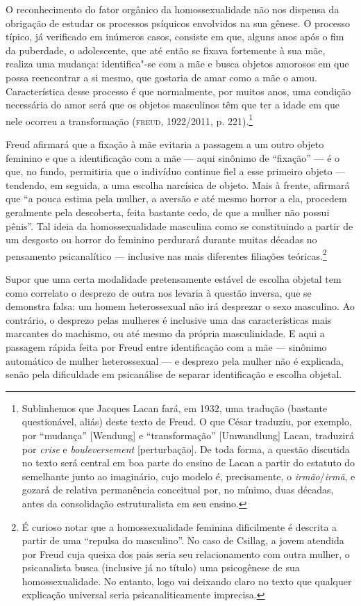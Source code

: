 O reconhecimento do fator orgânico da homossexualidade não nos dispensa
da obrigação de estudar os processos psíquicos envolvidos na sua gênese.
O processo típico, já verificado em inúmeros casos, consiste em que,
alguns anos após o fim da puberdade, o adolescente, que até então se
fixava fortemente à sua mãe, realiza uma mudança: identifica"-se com a
mãe e busca objetos amorosos em que possa reencontrar a si mesmo, que
gostaria de amar como a mãe o amou. Característica desse processo é que
normalmente, por muitos anos, uma condição necessária do amor será que
os objetos masculinos têm que ter a idade em que nele ocorreu a
transformação (\textsc{freud}, 1922/2011, p. 221).\footnote{Sublinhemos que
  Jacques Lacan fará, em 1932, uma tradução (bastante questionável,
  aliás) deste texto de Freud. O que César traduziu, por exemplo, por
  ``mudança'' {[}Wendung{]} e ``transformação'' {[}Umwandlung{]} Lacan,
  traduzirá por \emph{crise} e \emph{bouleversement} {[}perturbação{]}.
  De toda forma, a questão discutida no texto será central em boa parte
  do ensino de Lacan a partir do estatuto do semelhante junto ao
  imaginário, cujo modelo é, precisamente, o \emph{irmão}/\emph{irmã}, e
  gozará de relativa permanência conceitual por, no mínimo, duas
  décadas, antes da consolidação estruturalista em seu ensino.}

Freud afirmará que a fixação à mãe evitaria a passagem a um outro objeto
feminino e que a identificação com a mãe --- aqui sinônimo de
``fixação'' --- é o que, no fundo, permitiria que o indivíduo continue
fiel a esse primeiro objeto --- tendendo, em seguida, a uma escolha
narcísica de objeto. Mais à frente, afirmará que ``a pouca estima pela
mulher, a aversão e até mesmo horror a ela, procedem geralmente pela
descoberta, feita bastante cedo, de que a mulher não possui pênis''. Tal
ideia da homossexualidade masculina como se constituindo a partir de um
desgosto ou horror do feminino perdurará durante muitas décadas no
pensamento psicanalítico --- inclusive nas mais diferentes filiações
teóricas.\footnote{É curioso notar que a homossexualidade feminina
  dificilmente é descrita a partir de uma ``repulsa do masculino''. No
  caso de Csillag, a jovem atendida por Freud cuja queixa dos pais seria
  seu relacionamento com outra mulher, o psicanalista busca (inclusive
  já no título) uma psicogênese de sua homossexualidade. No entanto,
  logo vai deixando claro no texto que qualquer explicação universal
  seria psicanaliticamente imprecisa.}

Supor que uma certa modalidade pretensamente estável de escolha objetal
tem como correlato o desprezo de outra nos levaria à questão inversa,
que se demonstra falsa: um homem heterossexual não irá desprezar o
sexo masculino. Ao contrário, o desprezo pelas mulheres é inclusive uma
das características mais marcantes do machismo, ou até mesmo da própria
masculinidade. E aqui a passagem rápida feita por Freud entre
identificação com a mãe --- sinônimo automático de mulher heterossexual
--- e desprezo pela mulher não é explicada, senão pela dificuldade em
psicanálise de separar identificação e escolha objetal.

